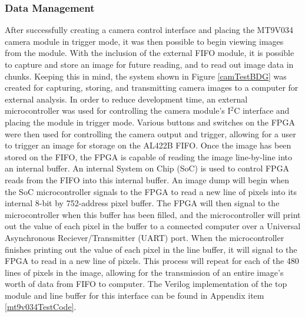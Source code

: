 \subsubsection{Data Management} 
After successfully creating a camera control interface and placing the MT9V034 camera module in trigger mode, it was then possible to begin viewing images from the module. With the inclusion of the external FIFO module, it is  possible to capture and store an image for future reading, and to read out image data in chunks. Keeping this in mind, the system shown in Figure \ref{camTestBDG} was created for capturing, storing, and transmitting camera images to a computer for external analysis. In order to reduce development time, an external microcontroller was used for controlling the camera module's I$^2$C interface and placing the module in trigger mode. Various buttons and switches on the FPGA were then used for controlling the camera output and trigger, allowing for a user to trigger an image for storage on the AL422B FIFO. Once the image has been stored on the FIFO, the FPGA is capable of reading the image line-by-line into an internal buffer. An internal System on Chip (SoC) is used to control FPGA reads from the FIFO into this internal buffer. An image dump will begin when the SoC microcontroller signals to the FPGA to read a new line of pixels into its internal 8-bit by 752-address pixel buffer. The FPGA will then signal to the microcontroller when this buffer has been filled, and the microcontroller will print out the value of each pixel in the buffer to a connected computer over a Universal Asynchronous Reciever/Transmitter (UART) port. When the microcontroller finishes printing out the value of each pixel in the line buffer, it will signal to the FPGA to read in a new line of pixels. This process will repeat for each of the 480 lines of pixels in the image, allowing for the transmission of an entire image's worth of data from FIFO to computer. The Verilog implementation of the top module and line buffer for this interface can be found in Appendix item \ref{mt9v034TestCode}.

